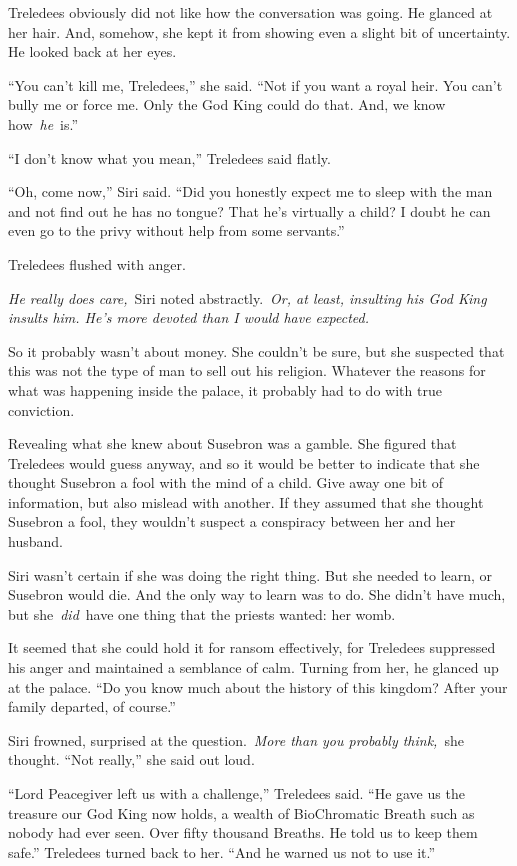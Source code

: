 Treledees obviously did not like how the conversation was going. He glanced at her hair. And, somehow, she kept it from showing even a slight bit of uncertainty. He looked back at her eyes.

“You can’t kill me, Treledees,” she said. “Not if you want a royal heir. You can’t bully me or force me. Only the God King could do that. And, we know how~\textit{he}~is.”

“I don’t know what you mean,” Treledees said flatly.

“Oh, come now,” Siri said. “Did you honestly expect me to sleep with the man and not find out he has no tongue? That he’s virtually a child? I doubt he can even go to the privy without help from some servants.”

Treledees flushed with anger.

\textit{He really does care,}~Siri noted abstractly.~\textit{Or, at least, insulting his God King insults him. He’s more devoted than I would have expected.}

So it probably wasn’t about money. She couldn’t be sure, but she suspected that this was not the type of man to sell out his religion. Whatever the reasons for what was happening inside the palace, it probably had to do with true conviction.

Revealing what she knew about Susebron was a gamble. She figured that Treledees would guess anyway, and so it would be better to indicate that she thought Susebron a fool with the mind of a child. Give away one bit of information, but also mislead with another. If they assumed that she thought Susebron a fool, they wouldn’t suspect a conspiracy between her and her husband.

Siri wasn’t certain if she was doing the right thing. But she needed to learn, or Susebron would die. And the only way to learn was to do. She didn’t have much, but she~\textit{did}~have one thing that the priests wanted: her womb.

It seemed that she could hold it for ransom effectively, for Treledees suppressed his anger and maintained a semblance of calm. Turning from her, he glanced up at the palace. “Do you know much about the history of this kingdom? After your family departed, of course.”

Siri frowned, surprised at the question.~\textit{More than you probably think,}~she thought. “Not really,” she said out loud.

“Lord Peacegiver left us with a challenge,” Treledees said. “He gave us the treasure our God King now holds, a wealth of BioChromatic Breath such as nobody had ever seen. Over fifty thousand Breaths. He told us to keep them safe.” Treledees turned back to her. “And he warned us not to use it.”


